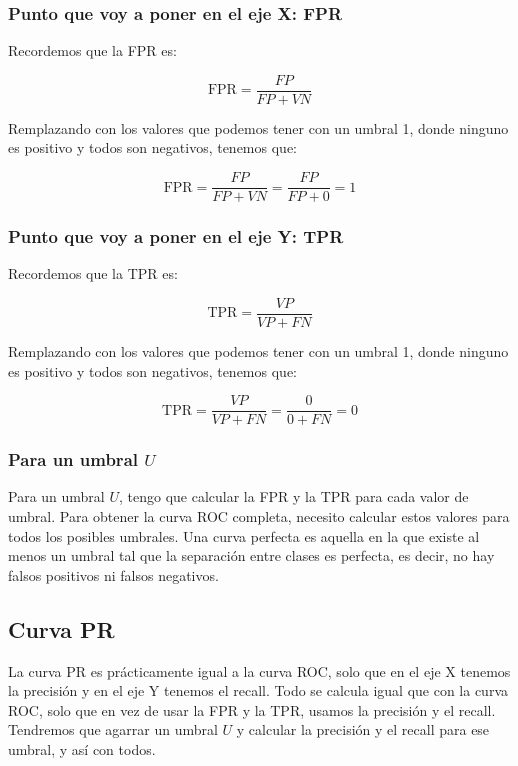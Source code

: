 \documentclass[12pt]{article}
\begin{document}
\subsubsection{Punto que voy a poner en el eje X: FPR}

Recordemos que la FPR es:

\[
\text{FPR} = \frac{FP}{FP + VN}
\]

\vspace{0.3em}

Remplazando con los valores que podemos tener con un umbral 1, donde ninguno es positivo y todos son negativos, tenemos que:

\[
\text{FPR} = \frac{FP}{FP + VN} = \frac{FP}{FP + 0} = 1
\]

\subsubsection{Punto que voy a poner en el eje Y: TPR}


Recordemos que la TPR es:

\[
\text{TPR} = \frac{VP}{VP + FN}
\]

\vspace{0.3em}

Remplazando con los valores que podemos tener con un umbral 1, donde ninguno es positivo y todos son negativos, tenemos que:

\[
\text{TPR} = \frac{VP}{VP + FN} = \frac{0}{0 + FN} = 0
\]

\subsubsection{Para un umbral \( U \)}

Para un umbral \( U \), tengo que calcular la FPR y la TPR para cada valor de umbral. Para obtener la curva ROC completa, necesito calcular estos valores para todos los posibles umbrales. Una curva perfecta es aquella en la que existe al menos un umbral tal que la separación entre clases es perfecta, es decir, no hay falsos positivos ni falsos negativos.

\subsection{Curva PR}

La curva PR es prácticamente igual a la curva ROC, solo que en el eje X tenemos la precisión y en el eje Y tenemos el recall. Todo se calcula igual que con la curva ROC, solo que en vez de usar la FPR y la TPR, usamos la precisión y el recall. Tendremos que agarrar un umbral \( U \) y calcular la precisión y el recall para ese umbral, y así con todos.
\end{document}
